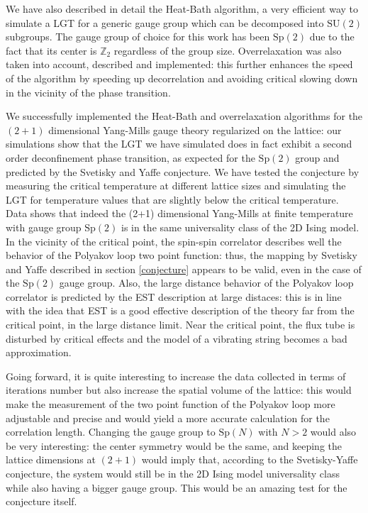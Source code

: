 \documentclass[reqno,12pt]{article}
\numberwithin{equation}{section}
\newcommand{\SU}{\mathrm{SU}}
\newcommand{\Sp}{\mathrm{Sp}}
\begin{document}
We have also described in detail the Heat-Bath algorithm, a very efficient way to simulate a LGT for a generic gauge
group which can be decomposed into $\SU(2)$ subgroups. The gauge group of choice for this work has been $\Sp(2)$ due to the 
fact that its center is $\mathbb{Z}_2$ regardless of the group size. Overrelaxation was also taken into account, described
and implemented: this further enhances the speed of the algorithm by speeding up decorrelation and avoiding critical 
slowing down in the vicinity of the phase transition. 

We successfully implemented the Heat-Bath and overrelaxation algorithms for the $(2+1)$ dimensional
Yang-Mills gauge theory regularized on the lattice: our simulations show that the LGT we have simulated
does in fact exhibit a second order deconfinement phase transition, as expected for the $\Sp(2)$ group and predicted by
the Svetisky and Yaffe conjecture. We have tested the conjecture by measuring the critical temperature at different lattice
sizes and simulating the LGT for temperature values that are slightly below the critical temperature. Data shows that
indeed the (2+1) dimensional Yang-Mills at finite temperature with gauge group $\Sp(2)$ is in the same universality class
of the 2D Ising model. In the vicinity of the critical point, the spin-spin correlator describes well the behavior
of the Polyakov loop two point function: thus, the mapping by Svetisky and Yaffe described in section \ref{conjecture} appears
to be valid, even in the case of the $\Sp(2)$ gauge group. Also, the large distance behavior of the Polyakov loop correlator
is predicted by the EST description at large distaces: this is in line with the idea that EST is a good effective description
of the theory far from the critical point, in the large distance limit. Near the critical point, the flux tube
is disturbed by critical effects and the model of a vibrating string becomes a bad approximation.

Going forward, it is quite interesting to increase the data collected in terms of iterations number but also increase 
the spatial volume of the lattice: this would make the measurement of the two point function of the Polyakov loop more
adjustable and precise and would yield a more accurate calculation for the correlation length. Changing the 
gauge group to $\Sp(N)$ with $N > 2$ would also be very interesting: the center symmetry would be the same, and keeping the
lattice dimensions at $(2+1)$ would imply that, according to the Svetisky-Yaffe conjecture, the system would still
be in the 2D Ising model universality class while also having a bigger gauge group. This would be an amazing test for the
conjecture itself. 
\end{document}
